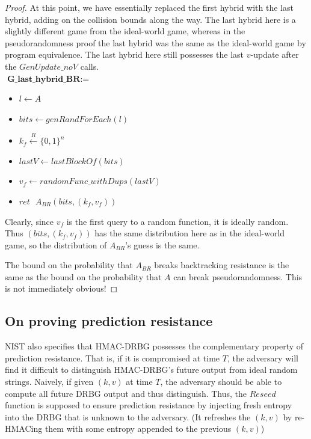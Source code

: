 \documentclass[12pt,lot, lof]{puthesis}
\newenvironment{game}
{ \begin{itemize}[noitemsep,nolistsep] 
}
{ \end{itemize}                  }
\newcommand{\s} {\textrm{ }}
\newcommand{\samp}{\xleftarrow{R} \{0,1\}}
\newcommand{\lar}{\leftarrow}
\begin{document}
\begin{proof}
At this point, we have essentially replaced the first hybrid with the last hybrid, adding on the collision bounds along the way. The last hybrid here is a slightly different game from the ideal-world game, whereas in the pseudorandomness proof the last hybrid was the same as the ideal-world game by program equivalence. The last hybrid here still possesses the last $v$-update after the $GenUpdate\_noV$ calls.\\

$\textbf{G\_last\_hybrid\_BR} := $
\begin{game}
\item[] $l \leftarrow A$ 
\item[] $bits \leftarrow genRandForEach(l)$
\item[] $k_f \samp^n$
\item[] $lastV \lar lastBlockOf(bits)$
\item[] $v_f \lar randomFunc\_withDups(lastV)$
\item[] $ret \s A_{BR}(bits, (k_f,v_f))$ \\
\end{game}

Clearly, since $v_f$ is the first query to a random function, it is ideally random. Thus $(bits, (k_f, v_f))$ has the same distribution here as in the ideal-world game, so the distribution of $A_{BR}$'s guess is the same.

The bound on the probability that $A_{BR}$ breaks backtracking resistance is the same as the bound on the probability that $A$ can break pseudorandomness. This is not immediately obvious!

\end{proof}

\subsection{On proving prediction resistance}

NIST also specifies that HMAC-DRBG possesses the complementary property of prediction resistance. That is, if it is compromised at time $T$, the adversary will find it difficult to distinguish HMAC-DRBG's future output from ideal random strings. Naively, if given $(k, v)$ at time $T$, the adversary should be able to compute all future DRBG output and thus distinguish. Thus, the $Reseed$ function is supposed to ensure prediction resistance by injecting fresh entropy into the DRBG that is unknown to the adversary. (It refreshes the $(k,v)$ by re-HMACing them with some entropy appended to the previous $(k,v)$)
\end{document}

